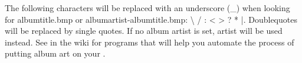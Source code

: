 The following characters will be replaced with an underscore (\_) when looking
for albumtitle.bmp or albumartist-albumtitle.bmp: \textbackslash{} / : <
> ? * |. Doublequotes will be replaced by single quotes.
If no album artist is set, artist will be used instead. See 
in the wiki for programs that will help you automate the process of putting
album art on your \dap{}.
